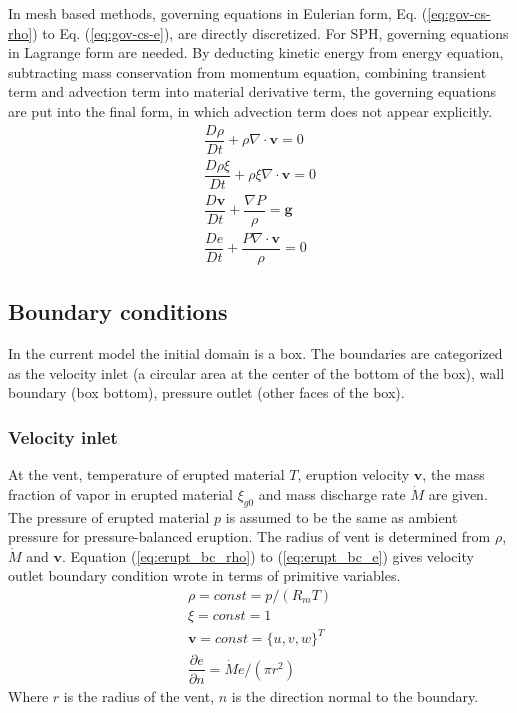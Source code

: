 \documentclass[journal abbreviation, manuscript]{copernicus}
\begin{document}
In mesh based methods, governing equations in Eulerian form, Eq. (\ref{eq:gov-cs-rho}) to Eq. (\ref{eq:gov-cs-e}), are directly discretized. For SPH, governing equations in Lagrange form are needed. By deducting kinetic energy from energy equation, subtracting mass conservation from momentum equation, combining transient term and advection term into material derivative term, the governing equations are put into the final form, in which advection term does not appear explicitly.
\begin{align}
\dfrac{D \rho}{D t} + \rho \nabla \cdot \textbf{v} = 0 \label{eq:gov-nc-rho}\\
\dfrac{D \rho \xi}{D t} + \rho \xi \nabla \cdot \textbf{v} = 0 \label{eq:gov-nc-ks}\\
\dfrac{D \textbf{v}}{D t} + \dfrac{\nabla P}{\rho} =\textbf{g} \label{eq:gov-nc-v}\\
\dfrac{D e}{D t} + \dfrac{P \nabla \cdot \textbf{v}}{\rho} = 0 \label{eq:gov-nc-e}
\end{align}

\subsection{Boundary conditions}
In the current model the initial domain is a box. The boundaries are categorized as the velocity inlet (a circular area at the center of the bottom of the box), wall boundary (box bottom), pressure outlet (other faces of the box).

\subsubsection{Velocity inlet}
At the vent, temperature of erupted material $T$, eruption velocity $\textbf{v}$, the mass fraction of vapor in erupted material $\xi_{g0}$ and mass discharge rate $\dot M$ are given. The pressure of erupted material $p$ is assumed to be the same as ambient pressure for pressure-balanced eruption. The radius of vent is determined from $\rho$, $\dot M$ and $\textbf{v}$. Equation (\ref{eq:erupt_bc_rho}) to (\ref{eq:erupt_bc_e}) gives velocity outlet boundary condition wrote in terms of primitive variables.
\begin{align}
\rho =const = p/\left(R_m T\right) \label{eq:erupt_bc_rho} \\
\xi=const=1 \label{eq:erupt_bc_xi}\\
\textbf{v} = const =\{u,v,w\}^T \label{eq:erupt_bc_v}\\
\dfrac{\partial e}{\partial n}=\dot M e /\left(\pi r^2\right) \label{eq:erupt_bc_e}
\end{align} 
Where $r$ is the radius of the vent, $n$ is the direction normal to the boundary.
\end{document}
